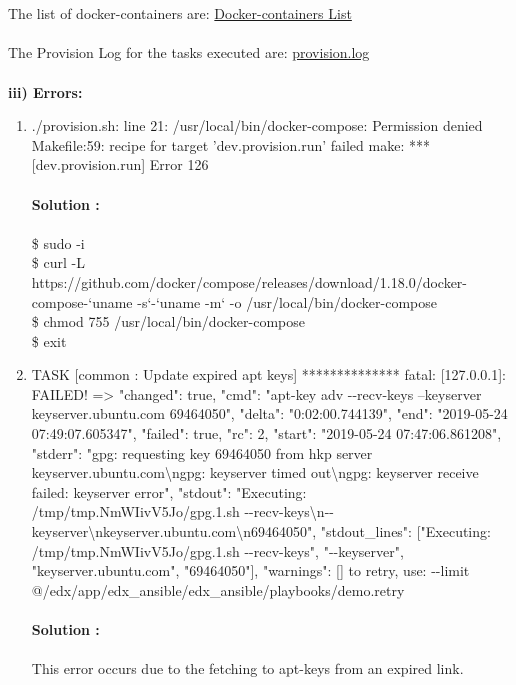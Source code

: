 \documentclass[12pt]{article}
\begin{document}
	\\\\
	The list of docker-containers are: \href{https://drive.google.com/open?id=0B168SrnPp4BpZ1RCQ1VncU81VEZYanl2SUNWN2dtRUg1bGRv}{Docker-containers List}
	\\\\
	The Provision Log for the tasks executed are: \href{https://drive.google.com/open?id=0B168SrnPp4BpclQ3d3gwbDNWLWtrUzduYUt6Vko4S2h6bzBz}{provision.log}\\\\
	\textbf{iii) Errors:}
	\begin{enumerate}
		\item  ./provision.sh: line 21: /usr/local/bin/docker-compose: Permission denied
		Makefile:59: recipe for target 'dev.provision.run' failed
		make: *** [dev.provision.run] Error 126\\\\
		\textbf{Solution :}\\\\
		\$ sudo -i\\
		\$ curl -L https://github.com/docker/compose/releases/download/1.18.0/docker-compose-`uname -s`-`uname -m` -o /usr/local/bin/docker-compose\\
		\$ chmod 755 /usr/local/bin/docker-compose\\
		\$ exit
		\item TASK [common : Update expired apt keys] **************
		fatal: [127.0.0.1]: FAILED! => {"changed": true, "cmd": "apt-key adv -{}-recv-keys --keyserver keyserver.ubuntu.com 69464050", "delta": "0:02:00.744139", "end": "2019-05-24 07:49:07.605347", "failed": true, "rc": 2, "start": "2019-05-24 07:47:06.861208", "stderr": "gpg: requesting key 69464050 from hkp server keyserver.ubuntu.com\textbackslash ngpg: keyserver timed out\textbackslash ngpg: keyserver receive failed: keyserver error", "stdout": "Executing: /tmp/tmp.NmWIivV5Jo/gpg.1.sh -{}-recv-keys\textbackslash n-{}-keyserver\textbackslash nkeyserver.ubuntu.com\textbackslash n69464050", "stdout\_lines": ["Executing: /tmp/tmp.NmWIivV5Jo/gpg.1.sh -{}-recv-keys", "-{}-keyserver", "keyserver.ubuntu.com", "69464050"], "warnings": []}
		to retry, use: -{}-limit @/edx/app/edx\_ansible/edx\_ansible/playbooks/demo.retry\\\\
		\textbf{Solution :}\\\\
		This error occurs due to the fetching to apt-keys from an expired link.\\

\end{enumerate}
\end{document}
